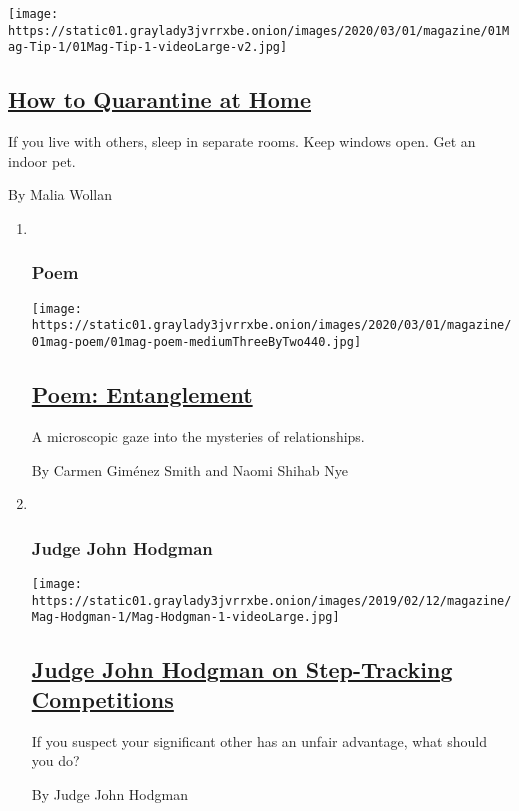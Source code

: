 \begin{enumerate}
  \texttt{[image: https://static01.graylady3jvrrxbe.onion/images/2020/03/01/magazine/01Mag-Tip-1/01Mag-Tip-1-videoLarge-v2.jpg]}

  \hypertarget{how-to-quarantine-at-home}{%
  \subsection{\texorpdfstring{\href{/2020/02/25/magazine/home-quarantine.html}{How
  to Quarantine at
  Home}}{How to Quarantine at Home}}\label{how-to-quarantine-at-home}}

  If you live with others, sleep in separate rooms. Keep windows open.
  Get an indoor pet.

  By Malia Wollan
\end{enumerate}

\begin{enumerate}
\def\labelenumi{\arabic{enumi}.}
\item ~
  \hypertarget{poem}{%
  \subsubsection{Poem}\label{poem}}

  \texttt{[image: https://static01.graylady3jvrrxbe.onion/images/2020/03/01/magazine/01mag-poem/01mag-poem-mediumThreeByTwo440.jpg]}

  \hypertarget{poem-entanglement}{%
  \subsection{\texorpdfstring{\href{/2020/02/27/magazine/poem-entanglement.html}{Poem:
  Entanglement}}{Poem: Entanglement}}\label{poem-entanglement}}

  A microscopic gaze into the mysteries of relationships.

  By Carmen Giménez Smith and Naomi Shihab Nye
\item ~
  \hypertarget{judge-john-hodgman}{%
  \subsubsection{Judge John Hodgman}\label{judge-john-hodgman}}

  \texttt{[image: https://static01.graylady3jvrrxbe.onion/images/2019/02/12/magazine/Mag-Hodgman-1/Mag-Hodgman-1-videoLarge.jpg]}

  \hypertarget{judge-john-hodgman-on-step-tracking-competitions}{%
  \subsection{\texorpdfstring{\href{/2020/02/27/magazine/judge-john-hodgman-on-step-tracking-competitions.html}{Judge
  John Hodgman on Step-Tracking
  Competitions}}{Judge John Hodgman on Step-Tracking Competitions}}\label{judge-john-hodgman-on-step-tracking-competitions}}

  If you suspect your significant other has an unfair advantage, what
  should you do?

  By Judge John Hodgman
\end{enumerate}

